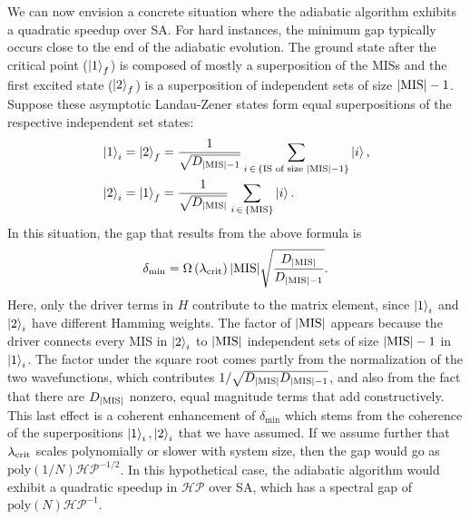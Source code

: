 \documentclass[twocolumn,amssymb,secnumarabic, prl, aps, nofootinbib]{revtex4-1}
\newcommand{\MIS}{\textnormal{MIS}}
\newcommand{\DMIS}{D_{|\textnormal{MIS}|}}
\newcommand{\DMISminusone}{D_{|\textnormal{MIS}|-1}}
\begin{document}
We can now envision a concrete situation where the adiabatic algorithm exhibits a quadratic speedup over SA. For hard instances, the minimum gap typically occurs close to the end of the adiabatic evolution. The ground state after the critical point ($\ket{1}_f$) is composed of mostly a superposition of the MISs and the first excited state ($\ket{2}_f$) is a superposition of independent sets of size $|\MIS|-1$. Suppose these asymptotic Landau-Zener states form equal superpositions of the respective independent set states:
\begin{align}
	&\ket{1}_i=\ket{2}_f=\frac{1}{\sqrt{\DMISminusone}}\sum_{i\,\in\,\{\text{IS of size } |\MIS|-1\}}\ket{i}, \\
	&\ket{2}_i=\ket{1}_f=\frac{1}{\sqrt{\DMIS}}\sum_{i\,\in\,\{\rm{MIS}\}}\ket{i}.
\end{align}
In this situation, the gap that results from the above formula is
\begin{equation}
	\delta_{\min}=\Omega\left(\lambda_{\text{crit}}\right)|\text{MIS}|\sqrt{\frac{\DMIS}{\DMISminusone}}.
\end{equation}
Here, only the driver terms in $H$ contribute to the matrix element, since $\ket{1}_{i}$ and $\ket{2}_{i}$ have different Hamming weights. %
The factor of $|\rm{MIS}|$ appears because the driver connects every MIS in $\ket{2}_i$ to $|\rm{MIS}|$ independent sets of size $|\MIS|-1$ in $\ket{1}_i$. The factor under the square root comes partly from the normalization of the two wavefunctions, which contributes $1/\sqrt{\DMIS \DMISminusone}$, and also from the fact that there are $\DMIS$ nonzero, equal magnitude terms that add constructively. This last effect is a coherent enhancement of $\delta_{\min}$ which stems from the coherence of the superpositions $\ket{1}_i,\ket{2}_i$ that we have assumed. If we assume further that $\lambda_{\rm{crit}}$ scales polynomially or slower with system size, then the gap would go as $\text{poly}(1/N)\mathcal{HP}^{-1/2}$.
In this hypothetical case, the adiabatic algorithm would exhibit a quadratic speedup in $\mathcal{HP}$ over SA, which has a spectral gap of $\text{poly}(N)\mathcal{HP}^{-1}$.
\end{document}

